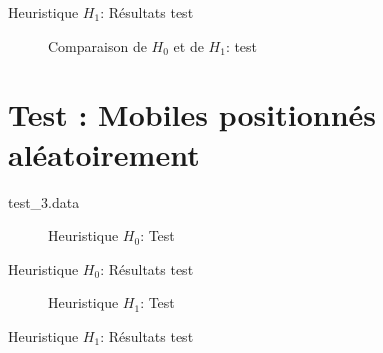   \begin{table}[H]
    \centering
    
    \caption{Heuristique $H_1$: Résultats test }
    \label{tab:H1_2}
  \end{table}

  \begin{figure}[H]
    \centering
    \boxed{
    \begin{tikzpicture}[yscale=0.5]
      
    \end{tikzpicture}}
    \caption{Comparaison de $H_0$ et de $H_1$: test }
    \label{fig:comp_2}
  \end{figure}


\section{Test : Mobiles positionnés aléatoirement}
  \begin{listing}[H]
    \caption{test\_3.data}
  \end{listing}

  \begin{figure}[H]
    \begin{center}
      \boxed{
      \begin{tikzpicture}[scale=0.5]
        
      \end{tikzpicture}}
    \end{center}
    \caption{Heuristique $H_0$: Test }
    \label{fig:H0_3}
  \end{figure}

  \begin{table}[H]
    \centering
    
    \caption{Heuristique $H_0$: Résultats test }
    \label{tab:H0_3}
  \end{table}

  \begin{figure}[H]
    \begin{center}
      \boxed{
      \begin{tikzpicture}[scale=0.5]
        
      \end{tikzpicture}}
    \end{center}
    \caption{Heuristique $H_1$: Test }
    \label{fig:H1_3}
  \end{figure}

  \begin{table}[H]
    \centering
    
    \caption{Heuristique $H_1$: Résultats test }
    \label{tab:H1_3}
  \end{table}

